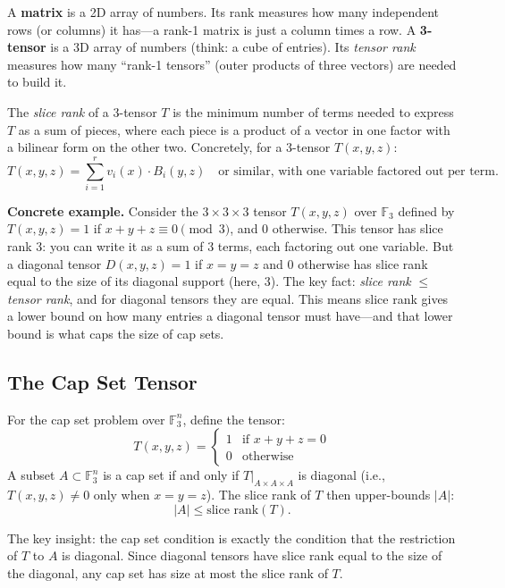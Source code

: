 A \textbf{matrix} is a 2D array of numbers. Its rank measures how many independent rows (or columns) it has---a rank-1 matrix is just a column times a row. A \textbf{3-tensor} is a 3D array of numbers (think: a cube of entries). Its \emph{tensor rank} measures how many ``rank-1 tensors'' (outer products of three vectors) are needed to build it.

\begin{definition}
The \emph{slice rank} of a 3-tensor $T$ is the minimum number of terms needed to express $T$ as a sum of pieces, where each piece is a product of a vector in one factor with a bilinear form on the other two. Concretely, for a 3-tensor $T(x,y,z)$:
\[
T(x,y,z) = \sum_{i=1}^{r} v_i(x) \cdot B_i(y,z) \quad \text{or similar, with one variable factored out per term.}
\]
\end{definition}

\textbf{Concrete example.} Consider the $3 \times 3 \times 3$ tensor $T(x,y,z)$ over $\mathbb{F}_3$ defined by $T(x,y,z) = 1$ if $x + y + z \equiv 0 \pmod{3}$, and $0$ otherwise. This tensor has slice rank 3: you can write it as a sum of 3 terms, each factoring out one variable. But a diagonal tensor $D(x,y,z) = 1$ if $x = y = z$ and $0$ otherwise has slice rank equal to the size of its diagonal support (here, 3). The key fact: \emph{slice rank} $\leq$ \emph{tensor rank}, and for diagonal tensors they are equal. This means slice rank gives a lower bound on how many entries a diagonal tensor must have---and that lower bound is what caps the size of cap sets.

\subsection{The Cap Set Tensor}

For the cap set problem over $\mathbb{F}_3^n$, define the tensor:
\[
T(x,y,z) = \begin{cases} 1 & \text{if } x + y + z = 0 \\ 0 & \text{otherwise} \end{cases}
\]
A subset $A \subset \mathbb{F}_3^n$ is a cap set if and only if $T|_{A \times A \times A}$ is diagonal (i.e., $T(x,y,z) \neq 0$ only when $x = y = z$). The slice rank of $T$ then upper-bounds $|A|$:
\[
|A| \le \text{slice rank}(T).
\]

\begin{highlightbox}
The key insight: the cap set condition is exactly the condition that the restriction of $T$ to $A$ is diagonal. Since diagonal tensors have slice rank equal to the size of the diagonal, any cap set has size at most the slice rank of $T$.
\end{highlightbox}

